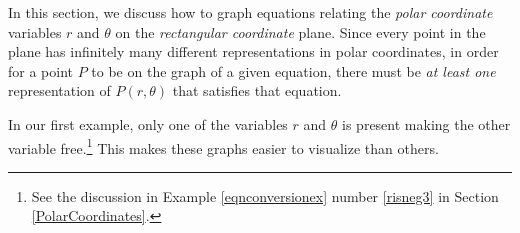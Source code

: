 

\setcounter{footnote}{0}

\label{PolarGraphs}

In this section, we discuss how to graph equations relating the \textit{polar coordinate} variables $r$ and $\theta$  on the \textit{rectangular coordinate} plane.  Since every point in the plane has infinitely many different representations in polar coordinates, in order for a point $P$ to be on the graph of a given equation,  there must be \textit{at least one} representation of $P(r, \theta)$ that satisfies that equation.  

\smallskip

In our first example,  only one of the variables $r$ and $\theta$ is present making the other variable free.\footnote{See the discussion in Example \ref{eqnconversionex} number \ref{risneg3} in Section \ref{PolarCoordinates}.}  This makes these graphs easier to visualize than others.


\smallskip

